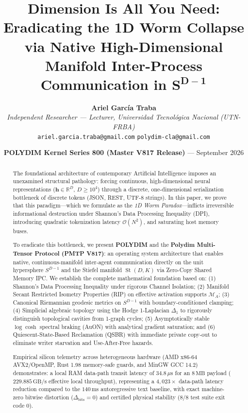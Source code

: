 \documentclass[11pt,twoside,a4paper]{article}
\title{\LARGE \textbf{Dimension Is All You Need:}\\[0.3em]
\Large \textbf{Eradicating the 1D Worm Collapse via Native High-Dimensional Manifold Inter-Process Communication in $\boldsymbol{S^{D-1}}$}}
\author{
  \textbf{Ariel García Traba}\\[0.2em]
  \textit{Independent Researcher --- Lecturer, Universidad Tecnol\'ogica Nacional (UTN-FRBA)}\\[0.1em]
  \texttt{ariel.garcia.traba@gmail.com} \quad \texttt{polydim-cla@gmail.com}
}
\date{\textbf{POLYDIM Kernel Series 800 (Master V817 Release)} --- September 2026}
\theoremstyle{plain}
\theoremstyle{definition}
\theoremstyle{remark}
\newcommand{\R}{\mathbb{R}}
\newcommand{\St}{\operatorname{St}}
\begin{document}
\maketitle

\begin{abstract}
The foundational architecture of contemporary Artificial Intelligence imposes an unexamined structural pathology: forcing continuous, high-dimensional neural representations ($\mathbf{h} \in \R^D$, $D \ge 10^4$) through a discrete, one-dimensional serialization bottleneck of discrete tokens (JSON, REST, UTF-8 strings). In this paper, we prove that this paradigm---which we formulate as the \textit{1D Worm Paradox}---inflicts irreversible informational destruction under Shannon's Data Processing Inequality (DPI), introducing quadratic tokenization latency $\mathcal{O}(N^2)$, and saturating host memory buses.

To eradicate this bottleneck, we present \textbf{POLYDIM} and the \textbf{Polydim Multi-Tensor Protocol (PMTP V817)}: an operating system architecture that enables native, continuous-manifold inter-agent communication directly on the unit hypersphere $S^{D-1}$ and the Stiefel manifold $\St(D, K)$ via Zero-Copy Shared Memory IPC. We establish the complete mathematical foundation based on: (1) Shannon's Data Processing Inequality under rigorous Channel Isolation; (2) Manifold Secant Restricted Isometry Properties (RIP) on effective activation supports $\mathcal{M}_A$; (3) Canonical Riemannian geodesic metrics on $S^{D-1}$ with boundary-conditioned clamping; (4) Simplicial algebraic topology using the Hodge 1-Laplacian $\Delta_1$ to rigorously distinguish topological cavities from 1-graph cycles; (5) Asymptotically stable $\log\cosh$ spectral braking (AuON) with analytical gradient saturation; and (6) Quiescent-State-Based Reclamation (QSBR) with immediate private copy-out to eliminate writer starvation and Use-After-Free hazards.

Empirical silicon telemetry across heterogeneous hardware (AMD x86-64 AVX2/OpenMP, Rust 1.98 memory-safe guards, and MinGW GCC 14.2) demonstrates: a local RAM data-path transit latency of $34.8\,\mu\text{s}$ for an $8\,\text{MB}$ payload ($229.885\,\text{GB/s}$ effective local throughput), representing a $4,023\times$ data-path latency reduction compared to the $140\,\text{ms}$ autoregressive text baseline, with exact machine-zero bitwise distortion ($\Delta_{\text{bits}} = 0$) and certified physical stability (8/8 test suite exit code 0).
\end{abstract}
\end{document}
